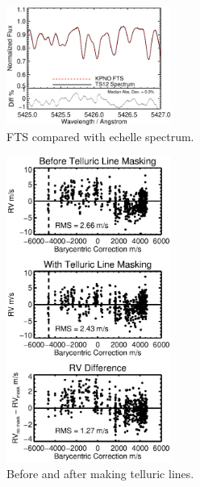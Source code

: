 \documentclass[12pt]{article}
\begin{document}
\begin{figure}
  \vspace{-35pt}
  \begin{center}
    \includegraphics[width=0.48\textwidth]{fts}
  \end{center}
  \vspace{-25pt}  
  \caption{FTS compared with echelle spectrum.}
  \vspace{-8pt}  
  \label{fts}
\end{figure}


\begin{figure}
  \vspace{-35pt}
  \begin{center}
    \includegraphics[width=0.48\textwidth]{telluric}
  \end{center}
  \vspace{-25pt}  
  \caption{Before and after making telluric lines.}
  \vspace{-8pt}  
  \label{tell}
\end{figure}
\end{document}
